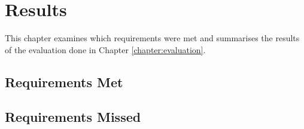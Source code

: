 \chapter{Results}
\label{chapter:results}
  This chapter examines which requirements were met and summarises the results of the evaluation done in Chapter \ref{chapter:evaluation}.

  \section{Requirements Met}
  \section{Requirements Missed}
